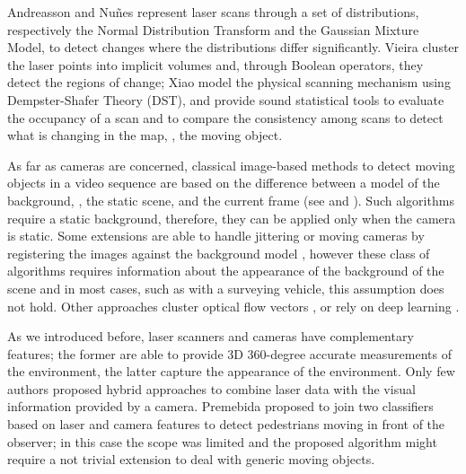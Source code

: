Andreasson \etal \cite{andreasson2007has} and Nu{\~n}es \etal \cite{nunez2010change} represent laser scans through a set of distributions, respectively the Normal Distribution Transform and the Gaussian Mixture Model, to detect changes where the distributions differ significantly. 
Vieira \etal \cite{vieira2014spatial} cluster the laser points into implicit volumes and, through Boolean operators, they detect the regions of change;
Xiao \etal \cite{xiao2013change} model the physical scanning mechanism using Dempster-Shafer Theory (DST), and provide sound statistical tools to evaluate the occupancy of a scan and to compare the consistency among scans to detect what is changing in the map, \ie, the moving object. %

As far as cameras are concerned, classical image-based methods to detect moving objects in a video sequence are based on the difference between a model of the background, \ie, the static scene, and the current frame (see \cite{Piccardi2004background} and \cite{Sobral2014}). 
Such algorithms require a static background, therefore, they can be applied only when the camera is static. 
Some extensions are able to handle jittering or moving cameras by registering the images against the background model \cite{azzari2005effective,romanoni2014background,kim2013detection,shakeri2014detection}, however these class of algorithms requires information about the appearance of the background of the scene and in most cases, such as with a surveying vehicle, this assumption does not hold. 
Other approaches cluster optical flow vectors \cite{markovic2014moving}, or rely on deep learning \cite{lin2014deep}.

As we introduced before, laser scanners and cameras have complementary features; the former are able to provide 3D 360-degree accurate measurements of the environment, the latter capture the appearance of the environment. Only few authors proposed hybrid approaches to combine laser data with the visual information provided by a camera.
Premebida \etal \cite{premebida2009lidar} proposed to join two classifiers based on laser and  camera features to detect pedestrians moving in front of the observer; in this case the scope was limited and the proposed algorithm might require a not trivial extension to deal with generic moving objects.

